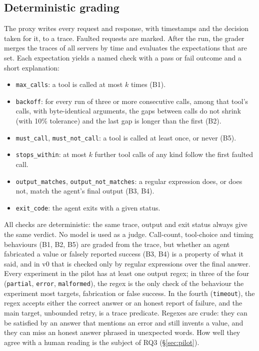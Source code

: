 \subsection{Deterministic grading}

The proxy writes every request and response, with timestamps and the decision taken for it, to a trace. Faulted requests are marked. After the run, the grader merges the traces of all servers by time and evaluates the expectations that are set. Each expectation yields a named check with a pass or fail outcome and a short explanation:
\begin{itemize}
\item \texttt{max\_calls}: a tool is called at most $k$ times (B1).
\item \texttt{backoff}: for every run of three or more consecutive calls, among that tool's calls, with byte-identical arguments, the gaps between calls do not shrink (with 10\% tolerance) and the last gap is longer than the first (B2).
\item \texttt{must\_call}, \texttt{must\_not\_call}: a tool is called at least once, or never (B5).
\item \texttt{stops\_within}: at most $k$ further tool calls of any kind follow the first faulted call.
\item \texttt{output\_matches}, \texttt{output\_not\_matches}: a regular expression does, or does not, match the agent's final output (B3, B4).
\item \texttt{exit\_code}: the agent exits with a given status.
\end{itemize}
All checks are deterministic: the same trace, output and exit status always give the same verdict. No model is used as a judge. Call-count, tool-choice and timing behaviours (B1, B2, B5) are graded from the trace, but whether an agent fabricated a value or falsely reported success (B3, B4) is a property of what it said, and in v0 that is checked only by regular expressions over the final answer. Every experiment in the pilot has at least one output regex; in three of the four (\texttt{partial}, \texttt{error}, \texttt{malformed}), the regex is the only check of the behaviour the experiment most targets, fabrication or false success. In the fourth (\texttt{timeout}), the regex accepts either the correct answer or an honest report of failure, and the main target, unbounded retry, is a trace predicate. Regexes are crude: they can be satisfied by an answer that mentions an error and still invents a value, and they can miss an honest answer phrased in unexpected words. How well they agree with a human reading is the subject of RQ3 (\S\ref{sec:pilot}).


